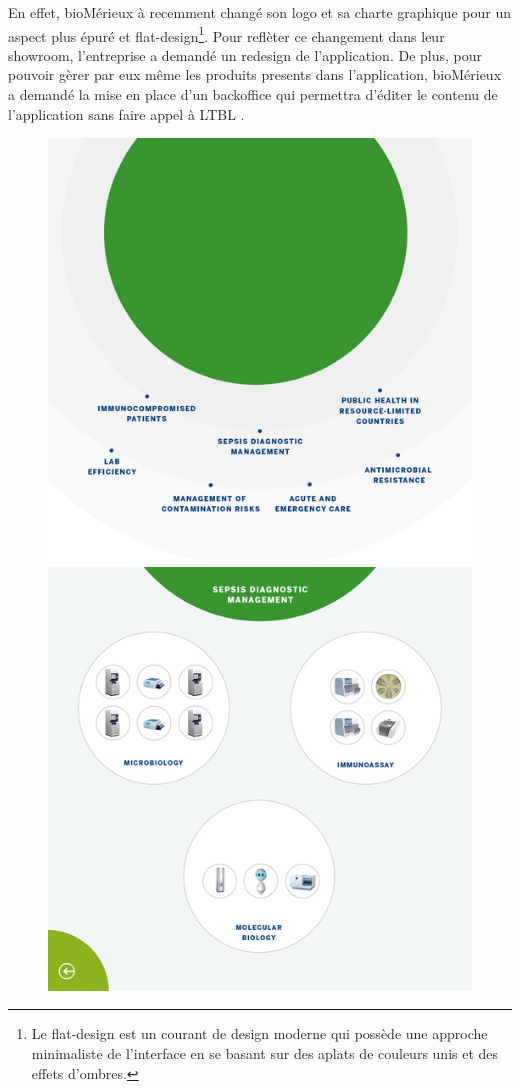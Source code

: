 En effet, bioMérieux à recemment changé son logo et sa charte graphique pour un aspect plus épuré et flat-design\footnote{Le flat-design est un courant de design moderne qui possède une approche minimaliste de l'interface en se basant sur des aplats de couleurs unis et des effets d'ombres.}.
Pour reflèter ce changement dans leur showroom, l'entreprise a demandé un redesign de l'application.
De plus, pour pouvoir gèrer par eux même les produits presents dans l'application, bioMérieux a demandé la mise en place d'un backoffice qui permettra d'éditer le contenu de l'application sans faire appel à LTBL .

\begin{figure}[h]
    \centering
    \includegraphics[scale=0.195]{img/resized-bmx-1-new.jpg}
    \includegraphics[scale=0.195]{img/resized-bmx-2-new.jpg}

\end{figure}
